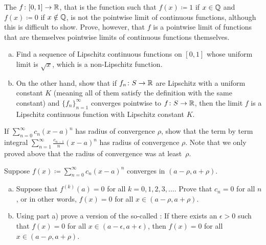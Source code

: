 \begin{exercise}[Challenging]
The 
$f \colon [0,1] \to {\mathbb{R}}$, that is the
function such that $f(x) \coloneqq 1$ if $x \in {\mathbb{Q}}$
and $f(x) \coloneqq 0$ if $x \notin {\mathbb{Q}}$,
is not the pointwise limit of
continuous functions, although this is difficult to show.
Prove, however, that $f$ is a pointwise limit of functions that are themselves
pointwise limits of
continuous functions themselves.
\end{exercise}

\begin{exercise}
\leavevmode
\begin{enumerate}[a)]
\item
Find a sequence of Lipschitz continuous functions on $[0,1]$
whose uniform limit is $\sqrt{x}$, which is a non-Lipschitz function.
\item
On the other hand, show that if $f_n \colon S \to {\mathbb{R}}$ are Lipschitz
with a uniform constant $K$ (meaning all of them satisfy the definition
with the same constant) and $\{ f_n \}_{n=1}^\infty$ converges pointwise
to $f \colon S \to {\mathbb{R}}$,
then the limit $f$ is a Lipschitz continuous function
with Lipschitz constant $K$.
\end{enumerate}
\end{exercise}

\begin{exercise}
If $\sum_{n=0}^\infty c_n {(x-a)}^n$ has radius of convergence $\rho$,
show that the term by term integral
$\sum_{n=1}^\infty \frac{c_{n-1}}{n} {(x-a)}^n$ has radius of convergence
$\rho$.  Note that we only proved above that the radius of convergence was
at least~$\rho$.
\end{exercise}

\begin{exercise}
\pagebreak[3]
Suppose $f(x) \coloneqq \sum_{n=0}^\infty c_n {(x-a)}^n$ converges in $(a-\rho,a+\rho)$.
\begin{enumerate}[a)]
\item
Suppose that $f^{(k)}(a) = 0$ for all $k=0,1,2,3,\ldots$.  Prove that
$c_n = 0$ for all $n$, or in other words, 
$f(x) = 0$ for all $x \in (a-\rho,a+\rho)$.
\item
Using part a) prove a version of the so-called :  If there exists an $\epsilon > 0$
such that $f(x) = 0$ for all $x \in (a-\epsilon, a+\epsilon)$, then
$f(x) = 0$ for all $x \in (a-\rho,a+\rho)$.
\end{enumerate}
\end{exercise}

